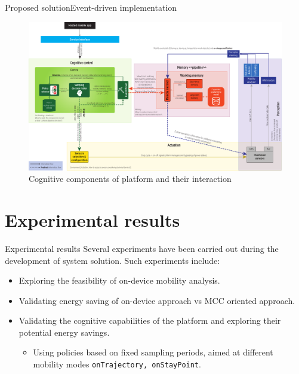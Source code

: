 \documentclass[8pt,xcolor={dvipsnames},handout]{beamer}
\begin{document}
\begin{frame}{Proposed solution}{Event-driven implementation}
\begin{figure}
  \centering
  \includegraphics[width=1\textwidth]{vectors/smartness-components-v4-for-slides}
  \caption{Cognitive components of platform and their interaction}
  \label{fig:cognitive-components}
\end{figure}
\end{frame}

\section{Experimental results}
\begin{frame}{Experimental results}
Several experiments have been carried out during the development of system solution.
Such experiments include:
\begin{itemize}
  \item Exploring the feasibility of on-device mobility analysis.
  \item Validating energy saving of on-device approach vs MCC oriented approach.
  \item Validating the cognitive capabilities of the platform and exploring their potential energy savings.
  \begin{itemize}
    \item Using policies based on fixed sampling periods, aimed at different mobility modes \texttt{\small onTrajectory, onStayPoint}.
  \end{itemize}
\end{itemize}
\end{frame}
\end{document}
